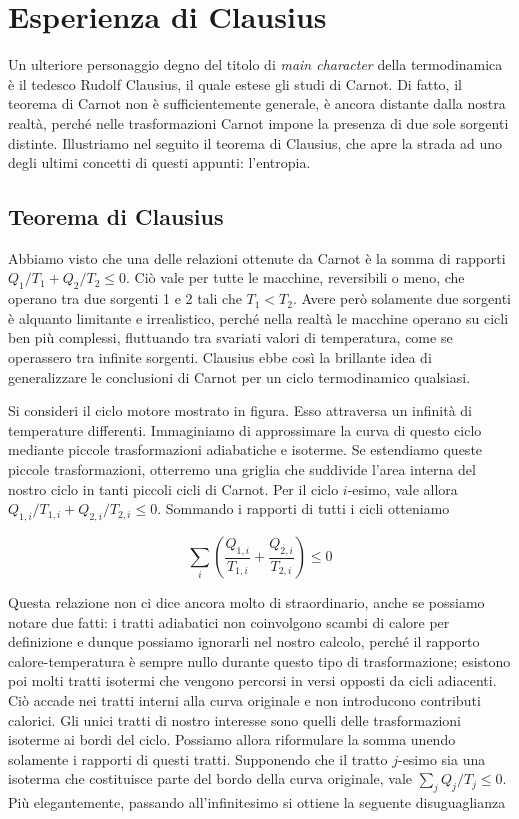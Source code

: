 \section{Esperienza di Clausius}
Un ulteriore personaggio degno del titolo di \textit{main character}
della termodinamica è il tedesco Rudolf Clausius, il quale estese
gli studi di Carnot. Di fatto, il teorema di Carnot non è sufficientemente
generale, è ancora distante dalla nostra realtà, perché nelle trasformazioni
Carnot impone la presenza di due sole sorgenti distinte. Illustriamo nel seguito
il teorema di Clausius, che apre la strada ad uno degli ultimi concetti di questi
appunti: l'entropia.

\subsection{Teorema di Clausius}
Abbiamo visto che una delle relazioni ottenute da Carnot è la
somma di rapporti $Q_1/T_1 + Q_2/T_2 \leq 0$. Ciò vale per tutte
le macchine, reversibili o meno, che operano tra due sorgenti 1
e 2 tali che $T_1 < T_2$. Avere però solamente due sorgenti è
alquanto limitante e irrealistico, perché nella realtà le macchine
operano su cicli ben più complessi, fluttuando tra svariati valori
di temperatura, come se operassero tra infinite sorgenti. Clausius
ebbe così la brillante idea di generalizzare le conclusioni di
Carnot per un ciclo termodinamico qualsiasi.


Si consideri il ciclo motore mostrato in figura. Esso attraversa
un infinità di temperature differenti. Immaginiamo di approssimare
la curva di questo ciclo mediante piccole trasformazioni adiabatiche
e isoterme. Se estendiamo queste piccole trasformazioni, otterremo
una griglia che suddivide l'area interna del nostro ciclo in tanti
piccoli cicli di Carnot. Per il ciclo $i$-esimo, vale allora
$Q_{1,i}/T_{1,i} + Q_{2,i}/T_{2,i} \leq 0$. Sommando i rapporti di
tutti i cicli otteniamo

\[ \sum_i \left(\frac{Q_{1,i}}{T_{1,i}} + \frac{Q_{2,i}}{T_{2,i}}\right) \leq 0 \]

\noindent Questa relazione non ci dice ancora molto di straordinario,
anche se possiamo notare due fatti: i tratti adiabatici non coinvolgono
scambi di calore per definizione e dunque possiamo ignorarli nel
nostro calcolo, perché il rapporto calore-temperatura è sempre nullo
durante questo tipo di trasformazione; esistono poi molti tratti
isotermi che vengono percorsi in versi opposti da cicli adiacenti.
Ciò accade nei tratti interni alla curva originale e non introducono
contributi calorici. Gli unici tratti di nostro interesse sono
quelli delle trasformazioni isoterme ai bordi del ciclo. Possiamo
allora riformulare la somma unendo solamente i rapporti di questi
tratti. Supponendo che il tratto $j$-esimo sia una isoterma che
costituisce parte del bordo della curva originale, vale
$\sum_j Q_j/T_j \leq 0$. Più elegantemente, passando all'infinitesimo
si ottiene la seguente disuguaglianza

